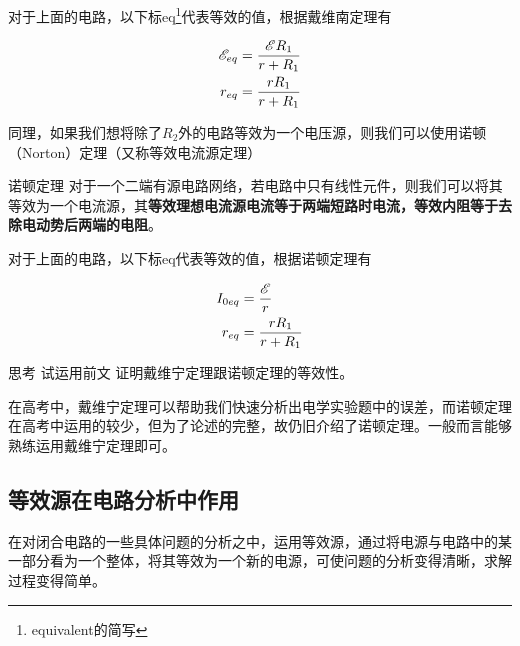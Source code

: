 对于上面的电路，以下标eq\footnote{equivalent的简写}代表等效的值，根据戴维南定理有



\begin{subequations}
\begin{align*}
\mathscr{E}_{eq} &= \frac{\mathscr{E} R_1}{r + R_1} \\
r_{eq} &= \frac{r R_1}{r + R_1}
\end{align*}
\end{subequations}

同理，如果我们想将除了$R_2$外的电路等效为一个电压源，则我们可以使用诺顿（Norton）定理（又称等效电流源定理）

\begin{theo}{诺顿定理}{}
对于一个二端有源电路网络，若电路中只有线性元件，则我们可以将其等效为一个电流源，其\textbf{等效理想电流源电流等于两端短路时电流，等效内阻等于去除电动势后两端的电阻}。
\end{theo}

对于上面的电路，以下标eq代表等效的值，根据诺顿定理有



\begin{subequations}
\begin{align*}
I_{0 eq} &= \frac{\mathscr{E}}{r} \\
r_{eq} &= \frac{r R_1}{r + R_1}
\end{align*}
\end{subequations}

\begin{mk}{思考}{}
试运用前文 证明戴维宁定理跟诺顿定理的等效性。
\end{mk}

在高考中，戴维宁定理可以帮助我们快速分析出电学实验题中的误差，而诺顿定理在高考中运用的较少，但为了论述的完整，故仍旧介绍了诺顿定理。一般而言能够熟练运用戴维宁定理即可。

\subsection{等效源在电路分析中作用}

在对闭合电路的一些具体问题的分析之中，运用等效源，通过将电源与电路中的某一部分看为一个整体，将其等效为一个新的电源，可使问题的分析变得清晰，求解过程变得简单。

